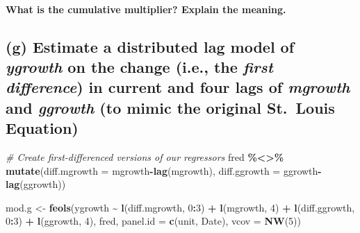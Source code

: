 \documentclass[
]{article}
\newenvironment{Shaded}{\begin{snugshade}}{\end{snugshade}}
\newcommand{\AttributeTok}[1]{\textcolor[rgb]{0.13,0.29,0.53}{#1}}
\newcommand{\CommentTok}[1]{\textcolor[rgb]{0.56,0.35,0.01}{\textit{#1}}}
\newcommand{\DecValTok}[1]{\textcolor[rgb]{0.00,0.00,0.81}{#1}}
\newcommand{\FunctionTok}[1]{\textcolor[rgb]{0.13,0.29,0.53}{\textbf{#1}}}
\newcommand{\NormalTok}[1]{#1}
\newcommand{\OtherTok}[1]{\textcolor[rgb]{0.56,0.35,0.01}{#1}}
\newcommand{\SpecialCharTok}[1]{\textcolor[rgb]{0.81,0.36,0.00}{\textbf{#1}}}
\newcommand{\StringTok}[1]{\textcolor[rgb]{0.31,0.60,0.02}{#1}}
\begin{document}
\hypertarget{what-is-the-cumulative-multiplier-explain-the-meaning.}{%
\paragraph{What is the cumulative multiplier? Explain the
meaning.}\label{what-is-the-cumulative-multiplier-explain-the-meaning.}}

\hypertarget{g-estimate-a-distributed-lag-model-of-ygrowth-on-the-change-i.e.-the-first-difference-in-current-and-four-lags-of-mgrowth-and-ggrowth-to-mimic-the-original-st.-louis-equation}{%
\subsection{\texorpdfstring{(g) Estimate a distributed lag model of
\emph{ygrowth} on the change (i.e., the \emph{first difference}) in
current and four lags of \emph{mgrowth} and \emph{ggrowth} (to mimic the
original St.~Louis
Equation)}{(g) Estimate a distributed lag model of ygrowth on the change (i.e., the first difference) in current and four lags of mgrowth and ggrowth (to mimic the original St.~Louis Equation)}}\label{g-estimate-a-distributed-lag-model-of-ygrowth-on-the-change-i.e.-the-first-difference-in-current-and-four-lags-of-mgrowth-and-ggrowth-to-mimic-the-original-st.-louis-equation}}

\begin{Shaded}
\begin{Highlighting}[]
\CommentTok{\# Create first{-}differenced versions of our regressors}
\NormalTok{fred }\SpecialCharTok{\%\textless{}\textgreater{}\%} \FunctionTok{mutate}\NormalTok{(}\AttributeTok{diff.mgrowth =}\NormalTok{ mgrowth}\SpecialCharTok{{-}}\FunctionTok{lag}\NormalTok{(mgrowth),}
                 \AttributeTok{diff.ggrowth =}\NormalTok{ ggrowth}\SpecialCharTok{{-}}\FunctionTok{lag}\NormalTok{(ggrowth))}

\NormalTok{mod.g }\OtherTok{\textless{}{-}} \FunctionTok{feols}\NormalTok{(ygrowth }\SpecialCharTok{\textasciitilde{}} \FunctionTok{l}\NormalTok{(diff.mgrowth, }\DecValTok{0}\SpecialCharTok{:}\DecValTok{3}\NormalTok{) }\SpecialCharTok{+} \FunctionTok{l}\NormalTok{(mgrowth, }\DecValTok{4}\NormalTok{) }\SpecialCharTok{+} \FunctionTok{l}\NormalTok{(diff.ggrowth, }\DecValTok{0}\SpecialCharTok{:}\DecValTok{3}\NormalTok{) }\SpecialCharTok{+} \FunctionTok{l}\NormalTok{(ggrowth, }\DecValTok{4}\NormalTok{),}
\NormalTok{               fred, }\AttributeTok{panel.id =} \FunctionTok{c}\NormalTok{(}\StringTok{\textquotesingle{}unit\textquotesingle{}}\NormalTok{, }\StringTok{\textquotesingle{}Date\textquotesingle{}}\NormalTok{),}
               \AttributeTok{vcov =} \FunctionTok{NW}\NormalTok{(}\DecValTok{5}\NormalTok{))}
\end{Highlighting}
\end{Shaded}
\end{document}
